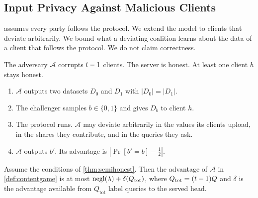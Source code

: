 \subsection{Input Privacy Against Malicious Clients}
\label{sec:malicious}

 assumes every party follows the protocol. We extend the
model to clients that deviate arbitrarily. We bound what a deviating coalition
learns about the data of a client that follows the protocol. We do not claim
correctness.

\begin{definition}
\label{def:contentgame}
The adversary $\mathcal{A}$ corrupts $t-1$ clients. The server is honest. At least one client $h$ stays honest.
\begin{enumerate}
\item $\mathcal{A}$ outputs two datasets $D_0$ and $D_1$ with $|D_0|=|D_1|$.
\item The challenger samples $b\in\{0,1\}$ and gives $D_b$ to client $h$.
\item The protocol runs. $\mathcal{A}$ may deviate arbitrarily in the values its
  clients upload, in the shares they contribute, and in the queries they ask.
\item $\mathcal{A}$ outputs $b'$. Its advantage is $|\Pr[b'=b]-\tfrac12|$.
\end{enumerate}
\end{definition}


\begin{theorem}
\label{thm:malicious}
Assume the conditions of \cref{thm:semihonest}. Then the advantage of
$\mathcal{A}$ in \cref{def:contentgame} is at most
$\mathrm{negl}(\lambda)+\delta(Q_{\mathrm{tot}})$, where
$Q_{\mathrm{tot}}=(t-1)Q$ and $\delta$ is the advantage available from
$Q_{\mathrm{tot}}$ label queries to the served head.
\end{theorem}

